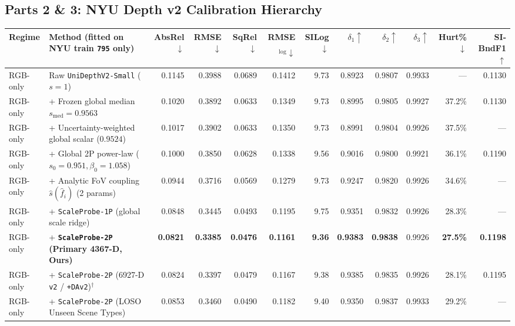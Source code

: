 \documentclass[10pt,twocolumn,letterpaper]{article}
\begin{document}
\subsection{Parts 2 \& 3: NYU Depth v2 Calibration Hierarchy}
\begin{table}[t]
\centering
\scriptsize
\setlength{\tabcolsep}{3.0pt}
\begin{tabular}{@{}llrrrrrrrrrr@{}}
\toprule
Regime & Method (fitted on NYU train \texttt{795} only) & AbsRel$\downarrow$ & RMSE$\downarrow$ & SqRel$\downarrow$ & RMSE$_{\log}\downarrow$ & SILog$\downarrow$ & $\delta_1\uparrow$ & $\delta_2\uparrow$ & $\delta_3\uparrow$ & Hurt\%$\downarrow$ & SI-BndF1$\uparrow$ \\
\midrule
RGB-only & Raw \texttt{UniDepthV2-Small} ($s=1$)                     & 0.1145 & 0.3988 & 0.0689 & 0.1412 & 9.73 & 0.8923 & 0.9807 & 0.9933 & ---    & 0.1130 \\
RGB-only & + Frozen global median $s_{\mathrm{med}}=0.9563$         & 0.1020 & 0.3892 & 0.0633 & 0.1349 & 9.73 & 0.8995 & 0.9805 & 0.9927 & 37.2\% & 0.1130 \\
RGB-only & + Uncertainty-weighted global scalar ($0.9524$)        & 0.1017 & 0.3902 & 0.0633 & 0.1350 & 9.73 & 0.8991 & 0.9804 & 0.9926 & 37.5\% & ---    \\
RGB-only & + Global 2P power-law ($s_0=0.951, \beta_0=1.058$)     & 0.1000 & 0.3850 & 0.0628 & 0.1338 & 9.56 & 0.9016 & 0.9800 & 0.9921 & 36.1\% & 0.1190 \\
RGB-only & + Analytic FoV coupling $\hat{s}(\hat{f}_i)$ (2 params) & 0.0944 & 0.3716 & 0.0569 & 0.1279 & 9.73 & 0.9247 & 0.9820 & 0.9926 & 34.6\% & ---    \\
RGB-only & + \texttt{ScaleProbe-1P} (global scale ridge)          & 0.0848 & 0.3445 & 0.0493 & 0.1195 & 9.75 & 0.9351 & 0.9832 & 0.9926 & 28.3\% & ---    \\
RGB-only & + \textbf{\texttt{ScaleProbe-2P} (Primary 4367-D, Ours)} & \textbf{0.0821} & \textbf{0.3385} & \textbf{0.0476} & \textbf{0.1161} & \textbf{9.36} & \textbf{0.9383} & \textbf{0.9838} & 0.9926 & \textbf{27.5\%} & \textbf{0.1198} \\
RGB-only & + \texttt{ScaleProbe-2P} (6927-D \texttt{v2} / \texttt{+DAv2})$^\dagger$ & 0.0824 & 0.3397 & 0.0479 & 0.1167 & 9.38 & 0.9385 & 0.9835 & 0.9926 & 28.1\% & 0.1195 \\
RGB-only & + \texttt{ScaleProbe-2P} (LOSO Unseen Scene Types)     & 0.0853 & 0.3460 & 0.0490 & 0.1182 & 9.40 & 0.9350 & 0.9837 & 0.9933 & 29.2\% & ---    \\

\end{tabular}
\end{table}
\end{document}

